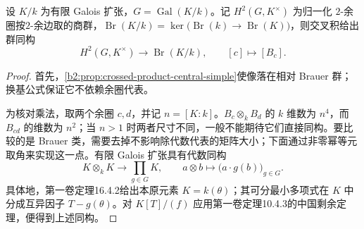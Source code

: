 \begin{theorem}\label{b2:thm:relative-brauer-cocycles}
	设 \(K/k\) 为有限 Galois 扩张，\(G=\operatorname{Gal}(K/k)\)。记 \(H^2(G,K^\times)\) 为归一化 \(2\)-余圈按\(2\)-余边取的商群，\(\operatorname{Br}(K/k)=\ker\bigl(\operatorname{Br}(k)\rightarrow\operatorname{Br}(K)\bigr)\)，则交叉积给出群同构
	\[
		H^2(G,K^\times)\longrightarrow\operatorname{Br}(K/k), \qquad[c]\longmapsto[B_c].
	\]
\end{theorem}
\begin{proof}
	首先，\cref{b2:prop:crossed-product-central-simple}使像落在相对 Brauer 群；换基公式保证它不依赖余圈代表。

	为核对乘法，取两个余圈 \(c,d\)，并记 \(n=[K:k]\)。\(B_c\otimes_kB_d\) 的 \(k\) 维数为 \(n^4\)，而 \(B_{cd}\) 的维数为 \(n^2\)；当 \(n>1\) 时两者尺寸不同，一般不能期待它们直接同构。要比较的是 Brauer 类，需要去掉不影响除代数代表的矩阵大小；下面通过非零幂等元取角来实现这一点。有限 Galois 扩张具有代数同构
	\begin{equation}\label{b2:eq:galois-tensor-diagonal}
		K\otimes_kK\longrightarrow\prod_{g\in G}K, \qquad a\otimes b\longmapsto\bigl(a\cdot g(b)\bigr)_{g\in G}.
	\end{equation}
	具体地，第一卷定理16.4.2给出本原元素 \(K=k(\theta)\)；其可分最小多项式在 \(K\) 中分成互异因子 \(T-g(\theta)\)。对 \(K[T]/(f)\) 应用第一卷定理10.4.3的中国剩余定理，便得到上述同构。


\end{proof}
